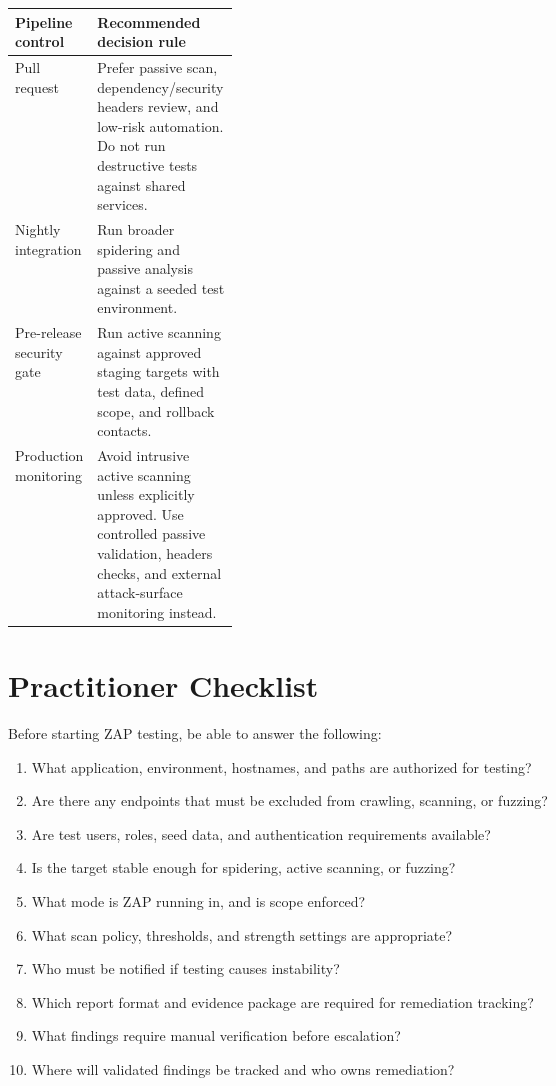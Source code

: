 \documentclass[11pt]{article}
\begin{document}
\begin{tabularx}{\linewidth}{@{}p{0.26\linewidth}Y@{}}
\toprule
\textbf{Pipeline control} & \textbf{Recommended decision rule} \\
\midrule
Pull request & Prefer passive scan, dependency/security headers review, and low-risk automation. Do not run destructive tests against shared services. \\
Nightly integration & Run broader spidering and passive analysis against a seeded test environment. \\
Pre-release security gate & Run active scanning against approved staging targets with test data, defined scope, and rollback contacts. \\
Production monitoring & Avoid intrusive active scanning unless explicitly approved. Use controlled passive validation, headers checks, and external attack-surface monitoring instead. \\
\bottomrule
\end{tabularx}

\section{Practitioner Checklist}

Before starting ZAP testing, be able to answer the following:

\begin{enumerate}
  \item What application, environment, hostnames, and paths are authorized for testing?
  \item Are there any endpoints that must be excluded from crawling, scanning, or fuzzing?
  \item Are test users, roles, seed data, and authentication requirements available?
  \item Is the target stable enough for spidering, active scanning, or fuzzing?
  \item What mode is ZAP running in, and is scope enforced?
  \item What scan policy, thresholds, and strength settings are appropriate?
  \item Who must be notified if testing causes instability?
  \item Which report format and evidence package are required for remediation tracking?
  \item What findings require manual verification before escalation?
  \item Where will validated findings be tracked and who owns remediation?
\end{enumerate}
\end{document}
